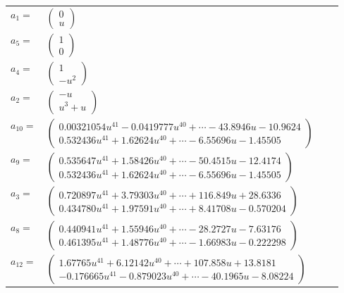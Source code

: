 \documentclass[1p]{elsarticle_modified}
\theoremstyle{definition}
\begin{document}
\begin{tabular}{m{7pt} m{180pt} m{7pt} m{180pt} }
\flushright $a_{1}=$&$\begin{pmatrix}0\\u\end{pmatrix}$ \\
\flushright $a_{5}=$&$\begin{pmatrix}1\\0\end{pmatrix}$ \\
\flushright $a_{4}=$&$\begin{pmatrix}1\\- u^2\end{pmatrix}$ \\
\flushright $a_{2}=$&$\begin{pmatrix}- u\\u^3+u\end{pmatrix}$ \\
\flushright $a_{10}=$&$\begin{pmatrix}0.00321054 u^{41}-0.0419777 u^{40}+\cdots-43.8946 u-10.9624\\0.532436 u^{41}+1.62624 u^{40}+\cdots-6.55696 u-1.45505\end{pmatrix}$ \\
\flushright $a_{9}=$&$\begin{pmatrix}0.535647 u^{41}+1.58426 u^{40}+\cdots-50.4515 u-12.4174\\0.532436 u^{41}+1.62624 u^{40}+\cdots-6.55696 u-1.45505\end{pmatrix}$ \\
\flushright $a_{3}=$&$\begin{pmatrix}0.720897 u^{41}+3.79303 u^{40}+\cdots+116.849 u+28.6336\\0.434780 u^{41}+1.97591 u^{40}+\cdots+8.41708 u-0.570204\end{pmatrix}$ \\
\flushright $a_{8}=$&$\begin{pmatrix}0.440941 u^{41}+1.55946 u^{40}+\cdots-28.2727 u-7.63176\\0.461395 u^{41}+1.48776 u^{40}+\cdots-1.66983 u-0.222298\end{pmatrix}$ \\
\flushright $a_{12}=$&$\begin{pmatrix}1.67765 u^{41}+6.12142 u^{40}+\cdots+107.858 u+13.8181\\-0.176665 u^{41}-0.879023 u^{40}+\cdots-40.1965 u-8.08224\end{pmatrix}$ \\

\end{tabular}
\end{document}
